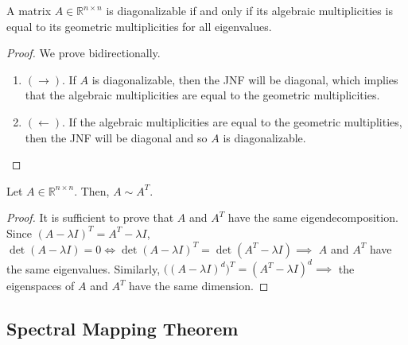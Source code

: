 	\begin{theorem}
	  \label{thm:diagonalizability-conditions-for-multiplicities}
		A matrix $A \in \mathbb{R}^{n \times n}$ is diagonalizable if and only if its algebraic multiplicities is equal to its geometric multiplicities for all eigenvalues. 
  \end{theorem}
	\begin{proof}
	  We prove bidirectionally. 
		\begin{enumerate}
		  \item $(\rightarrow)$. If $A$ is diagonalizable, then the JNF will be diagonal, which implies that the algebraic multiplicities are equal to the geometric multiplicities. 
			\item $(\leftarrow)$. If the algebraic multiplicities are equal to the geometric multiplities, then the JNF will be diagonal and so $A$ is diagonalizable. 
		\end{enumerate}
	\end{proof}

	\begin{corollary}
	  \label{thm:transposes-are-similar}
		Let $A \in \mathbb{R}^{n \times n}$. Then, $A \sim A^T$. 
  \end{corollary}
  \begin{proof}
		It is sufficient to prove that $A$ and $A^T$ have the same eigendecomposition. Since $(A - \lambda I)^T = A^T - \lambda I$, $\det{(A - \lambda I)} = 0 \iff \det{(A - \lambda I)^T} = \det{(A^T - \lambda I)} \implies $ $A$ and $A^T$ have the same eigenvalues. Similarly, $\big( (A - \lambda I)^d \big)^T = (A^T - \lambda I)^d \implies$ the eigenspaces of $A$ and $A^T$ have the same dimension. 
  \end{proof}

\subsection{Spectral Mapping Theorem}

